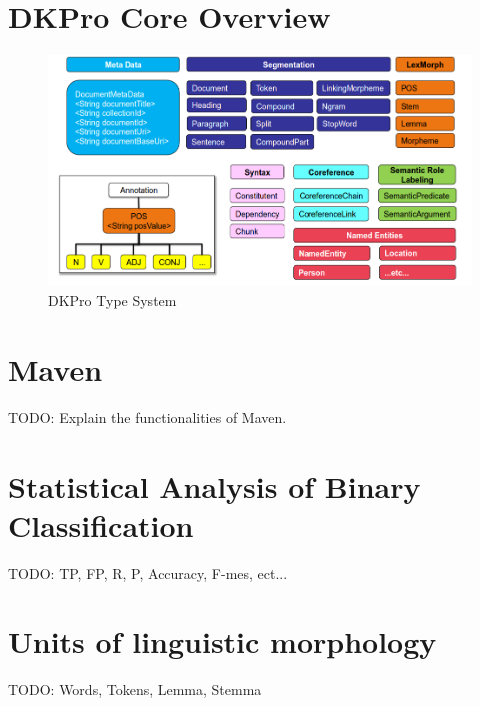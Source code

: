 \chapter{DKPro Core Overview}
\begin{figure}[ht]
    \centering
    \includegraphics[width=1\textwidth]{fig/dkpro-overview.png}
    \caption[Short caption]{DKPro Type System}
    \label{fig:dkpro-overview}
\end{figure}
\label{sec:dkpro overview}

\chapter{Maven}
\label{sec:maven}
TODO: Explain the functionalities of Maven.

\chapter{Statistical Analysis of Binary Classification}
\label{sec:stanabin}
TODO: TP, FP, R, P, Accuracy, F-mes, ect...

\chapter{Units of linguistic morphology}
\label{sec:linmorph}
TODO: Words, Tokens, Lemma, Stemma